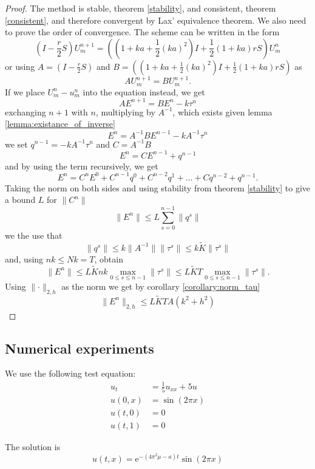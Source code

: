 \begin{proof}
    The method is stable, theorem \ref{stability}, and consistent, theorem \ref{consistent}, and therefore convergent by Lax' equivalence theorem. We also need to prove the order of convergence.
    The scheme can be written in the form
    $$\left(I - \frac{r}{2}S \right)U_{m}^{n+1} = \left( \left(1+ka+\frac{1}{2}(ka)^2\right)I + \frac{1}{2}\left(1+ka\right)rS\right)U_{m}^n$$
    or using $A = \left(I - \frac{r}{2}S \right)$ and $B = \left( \left(1+ka+\frac{1}{2}(ka)^2\right)I + \frac{1}{2}\left(1+ka\right)rS\right)$ as
    $$AU_{m}^{n+1} = BU_{m}^{n+1}.$$
    If we place $U_m^n - u_m^n$ into the equation instead, we get
    $$AE^{n+1} = BE^n - k\tau^n$$
    exchanging $n+1$ with $n$, multiplying by $A^{-1}$, which exists given lemma \ref{lemma:existance_of_inverse}
    $$E^n = A^{-1}BE^{n-1} -kA^{-1}\tau^n$$
    we set $q^{n-1}= -kA^{-1}\tau^n$ and $C=A^{-1}B$
    $$E^n = CE^{n-1}+q^{n-1}$$
    and by using the term recursively, we get
    $$E^n = C^nE^{0}+C^{n-1}q^0 + C^{n-2}q^1 + \dots + C q^{n-2} +  q^{n-1}.$$
    Taking the norm on both sides and using stability from theorem \ref{stability} to give a bound $L$ for $\lVert C^n \lVert$
    $$\lVert E^n\lVert  \leq L\sum_{s=0}^{n-1}\lVert q^s \lVert$$
    we the use that 
    $$\lVert q^s \lVert \leq k \lVert A^{-1} \lVert \lVert\tau^s \lVert \leq k \tilde{K} \lVert\tau^s \lVert$$
    and, using $nk\leq Nk=T$, obtain
    $$\lVert E^n \lVert \leq L \tilde{K}nk \max_{0\leq s \leq n-1} \lVert \tau^s\lVert \leq L \tilde{K}T\max_{0\leq s \leq n-1} \lVert \tau^s\lVert.$$
    Using $\lVert \cdot \lVert_{2, h}$ as the norm we get by corollary \ref{corollary:norm_tau}
    $$\lVert E^n \lVert_{2, h} \leq L \tilde{K}TA(k^2+h^2)$$
\end{proof}

\subsection{Numerical experiments}
We use the following test equation:
\begin{align}
  u_t &= \frac{1}{5}u_{xx} + 5 u \\
  u(0, x) &= \sin (2\pi x) \\
  u(t, 0) &= 0 \\
  u(t, 1) &= 0
\end{align}

The solution is
\begin{equation}
  \label{eq:anal_sol}
  u(t, x) = \text{e}^{-(4\pi^2 \mu - a)t}\sin(2\pi x)
\end{equation}

